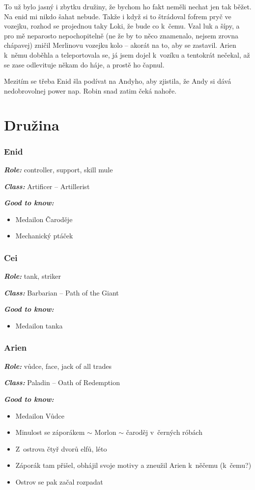 \documentclass[a4paper,twocolumn,openany,nodeprecatedcode, justified]{dndbook}
\newcommand{\bi}{\begin{itemize}}
\newcommand{\ei}{\end{itemize}}
\newcommand{\titulek}[1]{\par \noindent \textbf{\emph{#1:}}}
\begin{document}
	To už bylo jasný i zbytku družiny, že bychom ho fakt neměli nechat jen tak běžet. Na enid mi nikdo šahat nebude. Takže i když si to štrádoval fofrem pryč ve vozejku, rozhod se projednou taky Loki, že bude co k~čemu. Vzal luk a šípy, a pro mě neparosto nepochopitelně (ne že by to něco znamenalo, nejsem zrovna chápavej) zničil Merlinovu vozejku kolo -- akorát na to, aby se zastavil. Arien k~němu doběhla a teleportovala se, já jsem dojel k~vozíku a tentokrát nečekal, až se zase odlevituje někam do háje, a prostě ho čapnul.
	
	Mezitím se třeba Enid šla podívat na Andyho, aby zjistila, že Andy si dává nedobrovolnej power nap. Robin snad zatim čeká nahoře.
	
			
	
	\part{Družina}

	
	
	\section{Enid}
	\titulek{Role} controller, support, skill mule
	\titulek{Class} Artificer -- Artillerist
	\titulek{Good to know}
	\bi
	\item Medailon Čaroděje
	\item Mechanický ptáček
	\ei
	
	\section{Cei}
	\titulek{Role} tank, striker
	\titulek{Class} Barbarian -- Path of the Giant
	\titulek{Good to know} \bi
	\item Medailon tanka
	\ei
	
	\section{Arien}
	\titulek{Role} vůdce, face, jack of all trades
	\titulek{Class} Paladin -- Oath of Redemption
	\titulek{Good to know} \bi
	\item Medailon Vůdce
	\item Minulost se záporákem $\sim$ Morlon $\sim$ čaroděj v~černých róbách
	\item Z~ostrova čtyř dvorů elfů, léto
	\item Záporák tam přišel, obhájil svoje motivy a zneužil Arien k~něčemu (k~čemu?)
	\item Ostrov se pak začal rozpadat
	\ei
	
\end{document}
